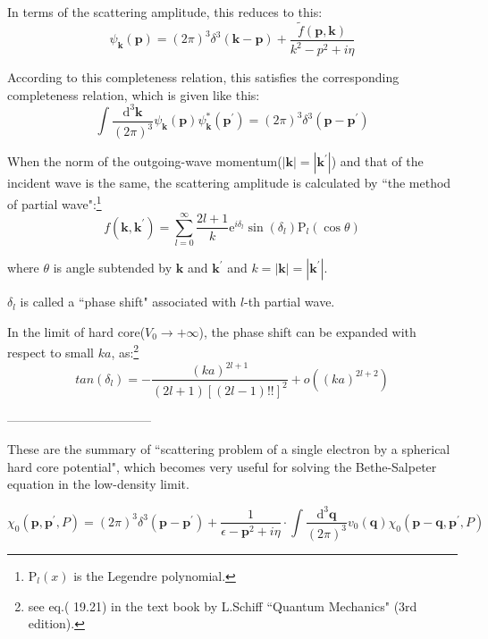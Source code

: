 In terms of the scattering amplitude, this reduces to this:
\begin{equation*} \label{Eqs2.7.A.7'} \tag{2.7.A.7'}
\psi_{\mathbf{k}} (\mathbf{p}) = (2\pi)^3 \delta^3(\mathbf{k}-\mathbf{p}) + \frac{\tilde{f}(\mathbf{p},\mathbf{k})}{k^2-p^2+i \eta}
\end{equation*}

According to this completeness relation, this satisfies the corresponding completeness relation, which is given like this:
\begin{equation*} \label{Eqs2.7.A.9} \tag{2.7.A.9}
\int \frac{\mathrm{d}^3 \mathbf{k}}{(2\pi)^3} \psi_{\mathbf{k}}(\mathbf{p}) \psi_{\mathbf{k}}^* (\mathbf{p}^{'}) = (2\pi) ^3 \delta^3 (\mathbf{p} - \mathbf{p}^{'})
\end{equation*}

When the norm of the outgoing-wave momentum($|\mathbf{k}| = |\mathbf{k}^{'}|$) and that of the incident wave is the same, the scattering amplitude is calculated by ``the method of partial wave":\footnote{$\mathrm{P}_l(x)$ is the Legendre polynomial.}
\begin{equation*} \label{Eqs2.7.A.10} \tag{2.7.A.10}
f(\mathbf{k},\mathbf{k}^{'}) = \sum_{l=0}^{\infty} \frac{2l+1}{k} \mathrm{e}^{i \delta_l} \sin(\delta_l) \mathrm{P}_l (\cos\theta)
\end{equation*}

where $\theta$ is angle subtended by $\mathbf{k}$ and $\mathbf{k}^{'}$ and $k = |\mathbf{k}| = |\mathbf{k}^{'}|$.

$\delta_l$ is called a ``phase shift" associated with $l$-th partial wave.

In the limit of hard core($V_0 \rightarrow +\infty$), the phase shift can be expanded with respect to small $ka$, as:\footnote{see eq.( 19.21) in the text book by L.Schiff ``Quantum Mechanics" (3rd edition).}
\begin{equation*} \label{Eqs2.7.A.11} \tag{2.7.A.11}
tan(\delta_l) = - \frac{(ka)^{2l+1}}{(2l+1)[(2l-1)!!]^2} + o((ka)^{2l+2})\end{equation*}

\begin{center}-----------------------------------\end{center}

These are the summary of ``scattering problem of a single electron by a spherical hard core potential", which becomes very useful for solving the Bethe-Salpeter equation in the low-density limit.

\begin{equation*}  \tag{2.7.18'}
\chi_0(\mathbf{p},\mathbf{p}^{'},P) = (2\pi)^3\delta^3(\mathbf{p}-\mathbf{p}^{'}) + \frac{1}{\epsilon-\mathbf{p}^2+i\eta}\cdot\int\frac{\mathrm{d}^3\mathbf{q}}{(2\pi)^3}v_0(\mathbf{q}) \chi_0(\mathbf{p}-\mathbf{q},\mathbf{p}^{'},P)
\end{equation*}

